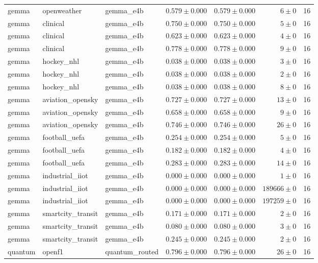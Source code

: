 \begin{table}[htbp]
\begin{tabular}{l l l r r r r}
gemma & openweather & gemma\_e4b & $0.579\pm0.000$ & $0.579\pm0.000$ & $6\pm0$ & 16 \\
gemma & clinical & gemma\_e4b & $0.750\pm0.000$ & $0.750\pm0.000$ & $5\pm0$ & 16 \\
gemma & clinical & gemma\_e4b & $0.623\pm0.000$ & $0.623\pm0.000$ & $4\pm0$ & 16 \\
gemma & clinical & gemma\_e4b & $0.778\pm0.000$ & $0.778\pm0.000$ & $9\pm0$ & 16 \\
gemma & hockey\_nhl & gemma\_e4b & $0.038\pm0.000$ & $0.038\pm0.000$ & $3\pm0$ & 16 \\
gemma & hockey\_nhl & gemma\_e4b & $0.038\pm0.000$ & $0.038\pm0.000$ & $2\pm0$ & 16 \\
gemma & hockey\_nhl & gemma\_e4b & $0.038\pm0.000$ & $0.038\pm0.000$ & $8\pm0$ & 16 \\
gemma & aviation\_opensky & gemma\_e4b & $0.727\pm0.000$ & $0.727\pm0.000$ & $13\pm0$ & 16 \\
gemma & aviation\_opensky & gemma\_e4b & $0.658\pm0.000$ & $0.658\pm0.000$ & $9\pm0$ & 16 \\
gemma & aviation\_opensky & gemma\_e4b & $0.746\pm0.000$ & $0.746\pm0.000$ & $26\pm0$ & 16 \\
gemma & football\_uefa & gemma\_e4b & $0.254\pm0.000$ & $0.254\pm0.000$ & $5\pm0$ & 16 \\
gemma & football\_uefa & gemma\_e4b & $0.182\pm0.000$ & $0.182\pm0.000$ & $4\pm0$ & 16 \\
gemma & football\_uefa & gemma\_e4b & $0.283\pm0.000$ & $0.283\pm0.000$ & $14\pm0$ & 16 \\
gemma & industrial\_iiot & gemma\_e4b & $0.000\pm0.000$ & $0.000\pm0.000$ & $1\pm0$ & 16 \\
gemma & industrial\_iiot & gemma\_e4b & $0.000\pm0.000$ & $0.000\pm0.000$ & $189666\pm0$ & 16 \\
gemma & industrial\_iiot & gemma\_e4b & $0.000\pm0.000$ & $0.000\pm0.000$ & $197259\pm0$ & 16 \\
gemma & smartcity\_transit & gemma\_e4b & $0.171\pm0.000$ & $0.171\pm0.000$ & $2\pm0$ & 16 \\
gemma & smartcity\_transit & gemma\_e4b & $0.080\pm0.000$ & $0.080\pm0.000$ & $3\pm0$ & 16 \\
gemma & smartcity\_transit & gemma\_e4b & $0.245\pm0.000$ & $0.245\pm0.000$ & $2\pm0$ & 16 \\
quantum & openf1 & quantum\_routed & $0.796\pm0.000$ & $0.796\pm0.000$ & $26\pm0$ & 16 \\

\end{tabular}
\end{table}
